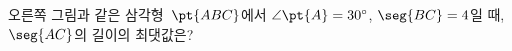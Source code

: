 \noindent\begin{minipage}[t]{0.58\linewidth}\vspace{0pt}\raggedright 오른쪽 그림과 같은 삼각형~$\pt{ABC}$에서 $\angle\pt{A}=30^\circ$, $\seg{BC}=4$일 때, $\seg{AC}$의 길이의 최댓값은?\end{minipage}\hfill\begin{minipage}[t]{0.4\linewidth}\vspace{0pt}\centering \resizebox{\ifdim\width>\linewidth\linewidth\else\width\fi}{!}{}\end{minipage}\par
{}
